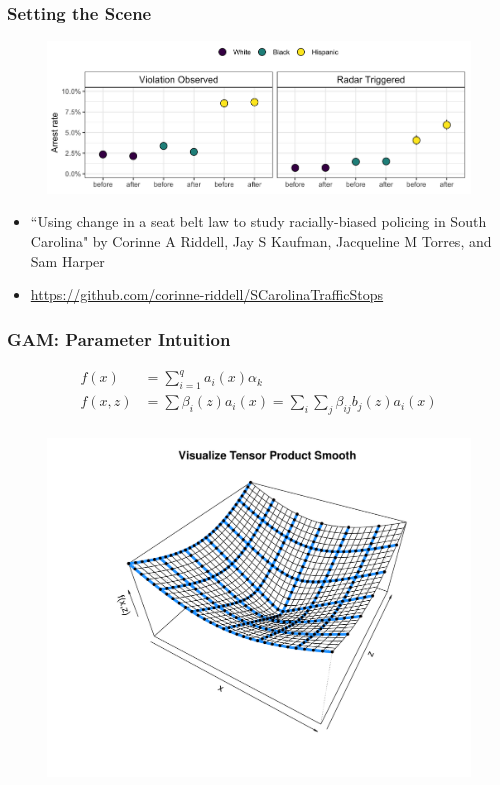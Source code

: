 \documentclass{beamer}
\begin{document}
\begin{frame}
\frametitle{Setting the Scene}


\begin{figure}
\includegraphics[scale=.5]{figures/arrestRates}
\end{figure}


\begin{itemize}

\item ``Using change in a seat belt law to study racially-biased policing in South Carolina" by Corinne A Riddell, Jay S Kaufman, Jacqueline M Torres, and Sam Harper

\item \url{https://github.com/corinne-riddell/SCarolinaTrafficStops}

\end{itemize}

\end{frame}


\begin{frame}
\frametitle{GAM: Parameter Intuition}

\small{
\begin{align*}
 f(x)&=\sum \limits_{i=1}^q a_i(x) \alpha_k\\
f(x,z)&= \sum \beta_i(z) a_i(x) = \sum_i \sum_j \beta_{ij} b_j(z) a_i(x) \\
\end{align*}}
\vspace{-.3in}
\begin{figure}
\includegraphics[scale=.25]{figures/tensorProductViz}

\end{figure}

\end{frame}

\end{document}

